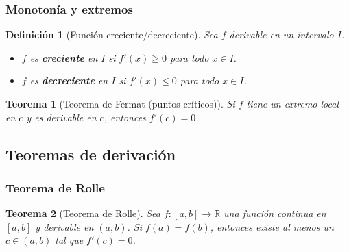 \documentclass[12pt, a4paper]{article}
\theoremstyle{rioplatense}
\newtheorem{definicion}{Definición}[section]
\newtheorem{teorema}{Teorema}[section]
\newtheorem{ejemplo}{Ejemplo}[section]
\begin{document}
%


\subsubsection{Monotonía y extremos}
\begin{definicion}[Función creciente/decreciente]
    Sea $f$ derivable en un intervalo $I$.
    \begin{itemize}
        \item $f$ es \textbf{creciente} en $I$ si $f'(x) \geq 0$ para todo $x \in I$.
        \item $f$ es \textbf{decreciente} en $I$ si $f'(x) \leq 0$ para todo $x \in I$.
    \end{itemize}
\end{definicion}

\begin{teorema}[Teorema de Fermat (puntos críticos)]
    Si $f$ tiene un extremo local en $c$ y es derivable en $c$, entonces $f'(c) = 0$.
\end{teorema}

\subsection{Teoremas de derivación}
\subsubsection{Teorema de Rolle}
\begin{teorema}[Teorema de Rolle]
    Sea $f: [a, b] \to \mathbb{R}$ una función continua en $[a, b]$ y derivable en $(a, b)$. Si $f(a) = f(b)$, entonces existe al menos un $c \in (a, b)$ tal que $f'(c) = 0$.
\end{teorema}
\end{document}
